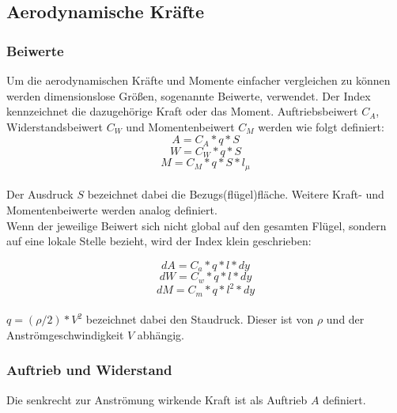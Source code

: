 \subsection{Aerodynamische Kräfte}
\label{aerokräfte}

\subsubsection{Beiwerte}
\label{beiwerte}

Um die aerodynamischen Kräfte und Momente einfacher vergleichen zu können werden dimensionslose Größen, sogenannte Beiwerte, verwendet. Der Index kennzeichnet die dazugehörige Kraft oder das Moment. Auftriebsbeiwert $C_A$, Widerstandsbeiwert $C_W$ und Momentenbeiwert $C_M$ werden wie folgt definiert:
\begin{equation}
A = C_A * q * S
\end{equation}
\begin{equation}
W = C_W * q * S
\end{equation}
\begin{equation}
M = C_M * q * S * l_\mu
\end{equation}
\\
Der Ausdruck $S$ bezeichnet dabei die Bezugs(flügel)fläche. Weitere Kraft- und Momentenbeiwerte werden analog definiert.\\

Wenn der jeweilige Beiwert sich nicht global auf den gesamten Flügel, sondern auf eine lokale Stelle bezieht, wird der Index klein geschrieben:

\begin{equation}
dA = C_a * q * l * dy
\end{equation}
\begin{equation}
dW = C_w * q * l * dy
\end{equation}
\begin{equation}
dM = C_m * q * l^2 * dy
\end{equation}
\\
$q = (\rho/2) * V^2$ bezeichnet dabei den Staudruck. Dieser ist von $\rho$ und der Anströmgeschwindigkeit $V$ abhängig.

\subsubsection{Auftrieb und Widerstand}
\label{auftriebwiderstand}

Die senkrecht zur Anströmung wirkende Kraft ist als Auftrieb $A$ definiert.

